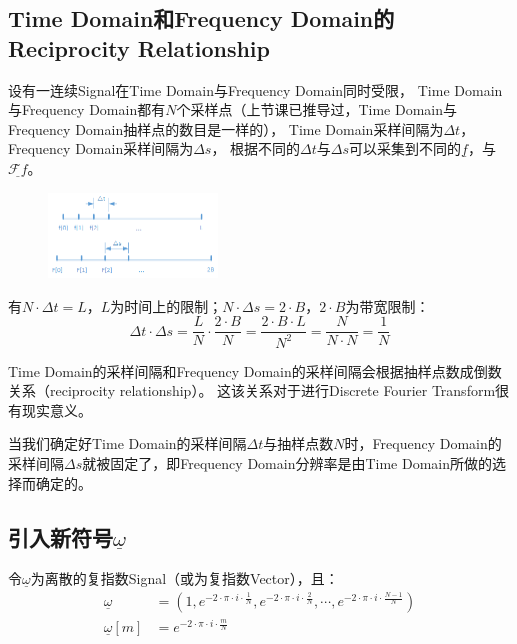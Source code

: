 \subsection{Time Domain和Frequency Domain的Reciprocity Relationship}
设有一连续Signal在Time Domain与Frequency Domain同时受限，
Time Domain与Frequency Domain都有$N$个采样点（上节课已推导过，Time Domain与Frequency Domain抽样点的数目是一样的），
Time Domain采样间隔为$\Delta t$，Frequency Domain采样间隔为$\Delta s$，
根据不同的$\Delta t$与$\Delta s$可以采集到不同的$\underline{f}$，与$\underline{\mathcal{F}f}$。
\begin{figure}[H]
	\centering
	\includegraphics[width=0.4\textwidth]{assets/DFT3.png}
\end{figure}

有$N\cdot\Delta t=L$，$L$为时间上的限制；$N\cdot \Delta s=2\cdot B$，$2\cdot B$为带宽限制：
$$
	\Delta t\cdot \Delta s=\frac{L}{N}\cdot \frac{2\cdot B}{N}=\frac{2\cdot B\cdot L}{N^2}=\frac{N}{N\cdot N}=\frac{1}{N}
$$

Time Domain的采样间隔和Frequency Domain的采样间隔会根据抽样点数成倒数关系（reciprocity relationship）。
这该关系对于进行Discrete Fourier Transform很有现实意义。

当我们确定好Time Domain的采样间隔$\Delta t$与抽样点数$N$时，Frequency Domain的采样间隔$\Delta s$就被固定了，即Frequency Domain分辨率是由Time Domain所做的选择而确定的。
\subsection{引入新符号$\underline{\omega}$}

令$\underline{\omega}$为离散的复指数Signal（或为复指数Vector），且：
\begin{align*}
	\underline{\omega}    & =(1,e^{-2\cdot \pi\cdot i\cdot\frac{1}{N}},e^{-2\cdot \pi\cdot i\cdot\frac{2}{N}},\cdots,e^{-2\cdot \pi\cdot i\cdot\frac{N-1}{N}}) \\
	\underline{\omega}[m] & =e^{-2\cdot \pi\cdot i\cdot\frac{m}{N}}
\end{align*}

